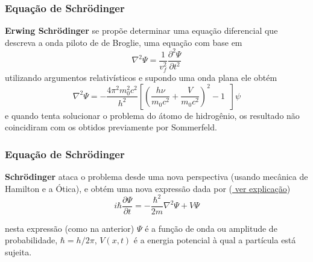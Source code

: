 \documentclass[12pt,brazil]{beamer}
\begin{document}
    
\begin{frame}
  \frametitle{Equação de Schrödinger}
  
        \fontsize{11pt}{10pt}\selectfont
%       
%      
      
        \textbf{Erwing Schrödinger} se propõe determinar uma equação diferencial que descreva a onda piloto de de Broglie, uma equação com base em 
        \[
         \nabla^2 \Psi = \dfrac{1}{v_f^2}\dfrac{\partial^2 \Psi}{\partial t^2}
        \]
        utilizando argumentos relativísticos e supondo uma onda plana ele obtém
        \[
         \nabla^2 \Psi =-\dfrac{4\pi^2m_0^2c^2}{h^2} \left[ \left(\dfrac{h\nu}{m_0c^2} + \dfrac{V}{m_0c^2}\right)^2-1 \;\;\right]\psi
        \]
        e quando tenta solucionar o problema do átomo de hidrogênio,  os resultado não coincidiram com os obtidos previamente por Sommerfeld.
%       
%       
  
\end{frame}



    
\begin{frame}
  \frametitle{Equação de Schrödinger}
  
        \fontsize{11pt}{10pt}\selectfont
%       
%      
      
        \textbf{Schrödinger} ataca o problema desde uma nova perspectiva (usando mecânica de Hamilton e a Ótica), e obtém uma nova expressão dada por (\href{http://jde27.uk/blog/why-schrodinger.html}{\fontsize{7pt}{11pt}\selectfont \color{blue} ver explicação})
        \[
          i\hbar\dfrac{\partial \Psi}{\partial t} = -\dfrac{\hbar^2}{2m} \nabla^2 \Psi + V \Psi
        \]
        
        nesta expressão (como na anterior) $\Psi$ é a função de onda ou amplitude de probabilidade, $\hbar = h/2\pi$, $V(x,t)$ é a energia potencial à qual a partícula está sujeita.

  
\end{frame}
   
\end{document}
